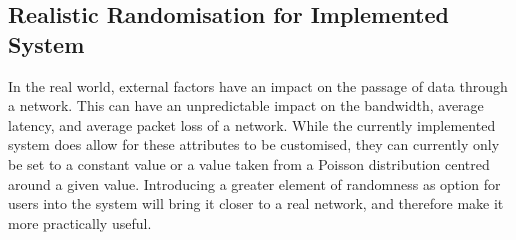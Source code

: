 \subsection{Realistic Randomisation for Implemented System}
In the real world, external factors have an impact on the passage of data through a network. This can have an unpredictable impact on the bandwidth, average latency, and average packet loss of a network. While the currently implemented system does allow for these attributes to be customised, they can currently only be set to a constant value or a value taken from a Poisson distribution centred around a given value. Introducing a greater element of randomness as option for users into the system will bring it closer to a real network, and therefore make it more practically useful. 
